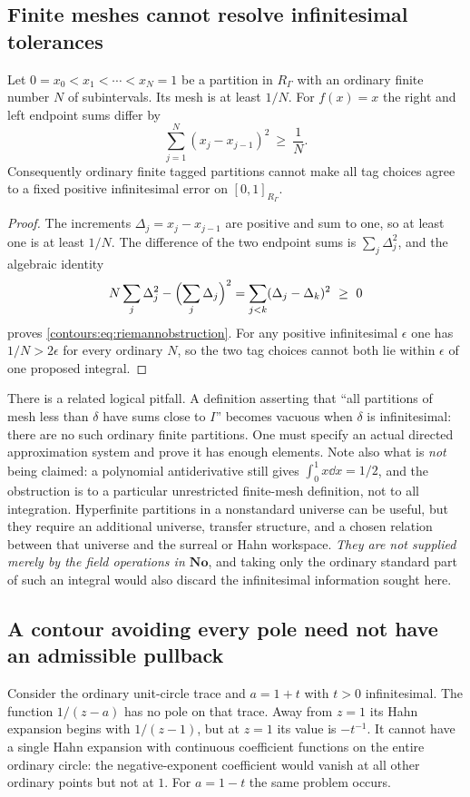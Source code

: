 \documentclass[11pt,letterpaper]{article}
\theoremstyle{definition}
\theoremstyle{remark}
\newcommand{\No}{\mathbf{No}}\newcommand{\SC}{\mathbf{SC}}
\numberwithin{equation}{section}
\begin{document}
\subsection{Finite meshes cannot resolve infinitesimal tolerances}
\begin{proposition}\label{contours:prop:mesh}
Let $0=x_0<x_1<\cdots<x_N=1$ be a partition in $R_\Gamma$ with an ordinary finite
number $N$ of subintervals. Its mesh is at least $1/N$. For $f(x)=x$ the right and
left endpoint sums differ by
\begin{equation}\label{contours:eq:riemannobstruction}
  \sum_{j=1}^N(x_j-x_{j-1})^2\ \ge\ \frac1N .
\end{equation}
Consequently ordinary finite tagged partitions cannot make all tag choices agree to
a fixed positive infinitesimal error on $[0,1]_{R_\Gamma}$.
\end{proposition}
\begin{proof}
The increments $\Delta_j=x_j-x_{j-1}$ are positive and sum to one, so at least one
is at least $1/N$. The difference of the two endpoint sums is $\sum_j\Delta_j^2$,
and the algebraic identity
\[
  N\sum_j\Delta_j^2-\Bigl(\sum_j\Delta_j\Bigr)^2
  =\sum_{j<k}(\Delta_j-\Delta_k)^2\ \ge\ 0
\]
proves \eqref{contours:eq:riemannobstruction}. For any positive infinitesimal
$\epsilon$ one has $1/N>2\epsilon$ for every ordinary $N$, so the two tag choices
cannot both lie within $\epsilon$ of one proposed integral.
\end{proof}

There is a related logical pitfall. A definition asserting that ``all partitions of
mesh less than $\delta$ have sums close to $I$'' becomes vacuous when $\delta$ is
infinitesimal: there are no such ordinary finite partitions. One must specify an
actual directed approximation system and prove it has enough elements. Note also
what is \emph{not} being claimed: a polynomial antiderivative still gives
$\int_0^1x\dd x=1/2$, and the obstruction is to a particular unrestricted
finite-mesh definition, not to all integration. Hyperfinite partitions in a
nonstandard universe can be useful, but they require an additional universe,
transfer structure, and a chosen relation between that universe and the surreal or
Hahn workspace. \emph{They are not supplied merely by the field operations in
$\No$}, and taking only the ordinary standard part of such an integral would also
discard the infinitesimal information sought here.

\subsection{A contour avoiding every pole need not have an admissible pullback}
\label{contours:subsec:boundarylayer}
Consider the ordinary unit-circle trace and $a=1+t$ with $t>0$ infinitesimal. The
function $1/(z-a)$ has no pole on that trace. Away from $z=1$ its Hahn expansion
begins with $1/(z-1)$, but at $z=1$ its value is $-t^{-1}$. It cannot have a single
Hahn expansion with continuous coefficient functions on the entire ordinary circle:
the negative-exponent coefficient would vanish at all other ordinary points but not
at $1$. For $a=1-t$ the same problem occurs.
\end{document}
